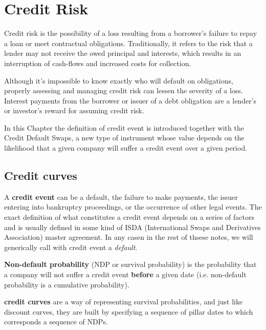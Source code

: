 \chapter{Credit Risk}\label{credit_default_swaps}

Credit risk is the possibility of a loss resulting from a borrower's failure to repay a loan or meet contractual obligations. Traditionally, it refers to the risk that a lender may not receive the owed principal and interests, which results in an interruption of cash-flows and increased costs for collection. 

Although it's impossible to know exactly who will default on obligations, properly assessing and managing credit risk can lessen the severity of a loss. Interest payments from the borrower or issuer of a debt obligation are a lender's or investor's reward for assuming credit risk.

In this Chapter the definition of credit event is introduced together with the Credit Default Swaps, a new type of instrument whose value depends on the likelihood that a given company will suffer a credit event over a given period.

\section{Credit curves}
\label{credit-curves}

A \textbf{credit event} can be a default, the failure to make payments, the issuer entering into bankruptcy proceedings, or the occurrence of other legal events. The exact definition of what constitutes a credit event depends on a series of factors and is usually defined in some kind of ISDA (International Swaps and Derivatives Association) master agreement. In any casen in the rest of thsese notes, we will generically call with credit event a \emph{default}.

\textbf{Non-default probability} (NDP or survival probability) is the probability that a company will not suffer a credit event \textbf{before} a given date (i.e. non-default probability is a cumulative probability).

\textbf{credit curves} are a way of representing survival probabilities, and just like discount curves, they are built by specifying a sequence of pillar dates to which corresponds a sequence of NDPs. 


